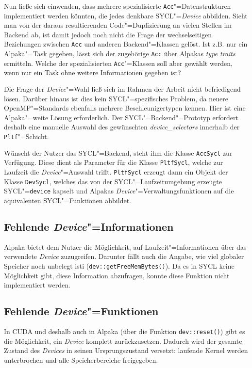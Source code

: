 Nun ließe sich einwenden, dass mehrere spezialisierte
\texttt{Acc}"=Datenstrukturen implementiert werden könnten, die jedes denkbare
SYCL"=\textit{Device} abbilden. Sieht man von der daraus resultierenden
Code"=Duplizierung an vielen Stellen im Backend ab, ist damit jedoch noch nicht
die Frage der wechselseitigen Beziehungen zwischen \texttt{Acc} und anderen
Backend"=Klassen gelöst. Ist z.B. nur ein Alpaka"=Task gegeben, lässt sich der
zugehörige \texttt{Acc} über Alpakas \textit{type traits} ermitteln. Welche der
spezialisierten \texttt{Acc}"=Klassen soll aber gewählt werden, wenn nur ein
Task ohne weitere Informationen gegeben ist?

Die Frage der \textit{Device}"=Wahl ließ sich im Rahmen der Arbeit nicht
befriedigend lösen. Darüber hinaus ist dies kein SYCL"=spezifisches Problem,
da neuere OpenMP"=Standards ebenfalls mehrere Beschleunigertypen kennen. Hier
ist eine Alpaka"=weite Lösung erforderlich. Der SYCL"=Backend"=Prototyp
erfordert deshalb eine manuelle Auswahl des gewünschten
\textit{device\_selectors} innerhalb der \texttt{Pltf}"=Schicht.

Wünscht der Nutzer das SYCL"=Backend, steht ihm die Klasse \texttt{AccSycl} zur
Verfügung. Diese dient als Parameter für die Klasse \texttt{PltfSycl}, welche
zur Laufzeit die \textit{Device}"=Auswahl trifft. \texttt{PltfSycl} erzeugt
dann ein Objekt der Klasse \texttt{DevSycl}, welches das von der
SYCL"=Laufzeitumgebung erzeugte SYCL"=\texttt{device} kapselt und Alpakas
\textit{Device}"=Verwaltungsfunktionen auf die äquivalenten SYCL"=Funktionen
abbildet.

\subsection{Fehlende \textit{Device}"=Informationen}

Alpaka bietet dem Nutzer die Möglichkeit, auf Laufzeit"=Informationen über das
verwendete \textit{Device} zuzugreifen. Darunter fällt auch die Angabe, wie viel
globaler Speicher noch unbelegt isti (\texttt{dev::getFreeMemBytes()}). Da es in
SYCL keine Möglichkeit gibt, diese Information abzufragen, konnte diese Funktion
nicht implementiert werden.

\subsection{Fehlende \textit{Device}"=Funktionen}

In CUDA und deshalb auch in Alpaka (über die Funktion \texttt{dev::reset()})
gibt es die Möglichkeit, ein \textit{Device} komplett zurückzusetzen. Dadurch
wird der gesamte Zustand des \textit{Devices} in seinen Ursprungszustand
versetzt: laufende Kernel werden unterbrochen und alle Speicherbereiche
freigegeben. 

